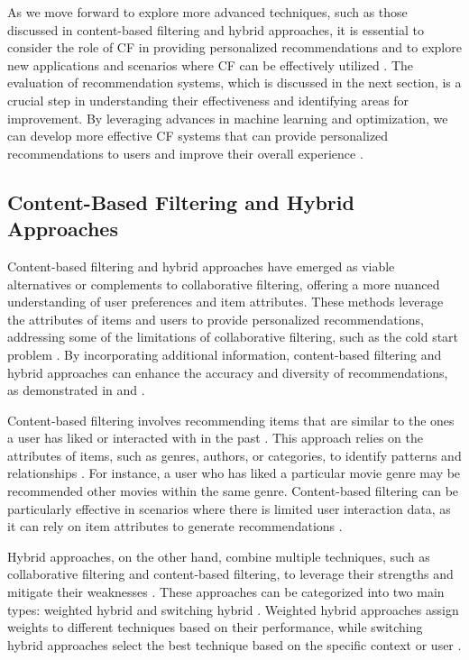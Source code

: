 \documentclass[11pt,a4paper]{article}
\begin{document}
As we move forward to explore more advanced techniques, such as those discussed in content-based filtering and hybrid approaches, it is essential to consider the role of CF in providing personalized recommendations and to explore new applications and scenarios where CF can be effectively utilized \cite{arxiv:2206.04415}. The evaluation of recommendation systems, which is discussed in the next section, is a crucial step in understanding their effectiveness and identifying areas for improvement. By leveraging advances in machine learning and optimization, we can develop more effective CF systems that can provide personalized recommendations to users and improve their overall experience \cite{doi:10.1145/3434185}.


\subsection{Content-Based Filtering and Hybrid Approaches}


Content-based filtering and hybrid approaches have emerged as viable alternatives or complements to collaborative filtering, offering a more nuanced understanding of user preferences and item attributes. These methods leverage the attributes of items and users to provide personalized recommendations, addressing some of the limitations of collaborative filtering, such as the cold start problem \cite{doi:10.1155/2009/421425}. By incorporating additional information, content-based filtering and hybrid approaches can enhance the accuracy and diversity of recommendations, as demonstrated in \cite{doi:10.1088/1367-2630/11/12/123008} and \cite{doi:10.1073/pnas.1000488107}.

Content-based filtering involves recommending items that are similar to the ones a user has liked or interacted with in the past \cite{doi:10.1214/09-aos759}. This approach relies on the attributes of items, such as genres, authors, or categories, to identify patterns and relationships \cite{arxiv:1707.07435}. For instance, a user who has liked a particular movie genre may be recommended other movies within the same genre. Content-based filtering can be particularly effective in scenarios where there is limited user interaction data, as it can rely on item attributes to generate recommendations \cite{doi:10.1016/j.eswa.2016.09.040}.

Hybrid approaches, on the other hand, combine multiple techniques, such as collaborative filtering and content-based filtering, to leverage their strengths and mitigate their weaknesses \cite{doi:10.1109/access.2019.2905534}. These approaches can be categorized into two main types: weighted hybrid and switching hybrid \cite{doi:10.1007/978-1-0716-2197-4_2}. Weighted hybrid approaches assign weights to different techniques based on their performance, while switching hybrid approaches select the best technique based on the specific context or user \cite{doi:10.1109/access.2020.2975167}.
\end{document}
